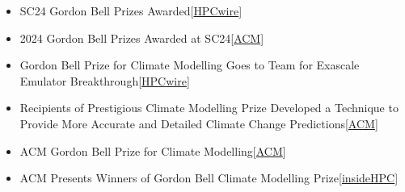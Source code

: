 \documentclass{resume} %
\let\OrigRSection\rSection
\let\OrigEndRSection\endrSection
\let\OrigMakeUppercase\MakeUppercase
\renewenvironment{rSection}[1]{
    \renewcommand{\MakeUppercase}[1]{\textcolor{blue}{\OrigMakeUppercase{##1}}}%
    \OrigRSection{#1}%
}{%
    \OrigEndRSection%
}
\begin{document}
\begin{rSection}{\faNewspaperO ~MEDIA COVERAGE}
  
  \begin{itemize}%
    \setlength{\itemindent}{-.2in}
    \item SC24 Gordon Bell Prizes Awarded\hfill[\href{https://www.hpcwire.com/2024/12/03/sc24-gordon-bell-prizes-awarded/}{HPCwire}]
    \item 2024 Gordon Bell Prizes Awarded at SC24\hfill[\href{https://www.ifipnews.org/2024-gordon-bell-prizes-awarded-at-sc24-2/}{ACM}]
    \item Gordon Bell Prize for Climate Modelling Goes to Team for Exascale Emulator Breakthrough\hfill[\href{https://www.hpcwire.com/off-the-wire/gordon-bell-prize-for-climate-modelling-goes-to-team-for-exascale-emulator-breakthrough/}{HPCwire}]
    \item Recipients of Prestigious Climate Modelling Prize Developed a Technique to Provide More Accurate and Detailed Climate Change Predictions\hfill[\href{https://www.acm.org/media-center/2024/november/gordon-bell-climate-2024}{ACM}]
    \item ACM Gordon Bell Prize for Climate Modelling\hfill[\href{https://awards.acm.org/bell-climate}{ACM}]
    \item ACM Presents Winners of Gordon Bell Climate Modelling Prize\hfill[\href{https://insidehpc.com/2024/11/acm-presents-winners-of-gordon-bell-climate-modelling-prize/}{insideHPC}]

\end{itemize}
\end{rSection}
\end{document}
